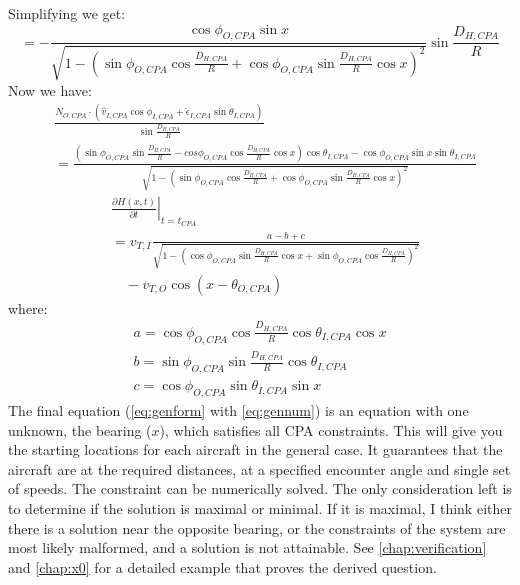 Simplifying we get:
\begin{equation}
    =-\frac{\cos{\phi_{O,CPA}}\sin{x}}{\sqrt{1-\left( \sin{\phi_{O,CPA}}\cos{\frac{D_{H,CPA}}{R}} + \cos{\phi_{O,CPA}}\sin{\frac{D_{H,CPA}}{R}}\cos{x} \right)^{2}}}\sin{\frac{D_{H,CPA}}{R}}
\end{equation}
Now we have:
\begin{equation}
    \begin{aligned}
        &\frac{N_{O,CPA} \cdot (\hat{v}_{I,CPA}\cos{\phi_{I,CPA}}+\hat{\epsilon}_{I,CPA}\sin{\theta_{I,CPA}})}{\sin{\frac{D_{H,CPA}}{R}}} \\
        &= \frac{\left( \sin{\phi_{O,CPA}}\sin{\frac{D_{H,CPA}}{R}} - cos{\phi_{O,CPA}}\cos{\frac{D_{H,CPA}}{R}}\cos{x} \right)\cos{\theta_{I,CPA}} - \cos{\phi_{O,CPA}}\sin{x}\sin{\theta_{I,CPA}}}{\sqrt{1-\left( \sin{\phi_{O,CPA}}\cos{\frac{D_{H,CPA}}{R}} + \cos{\phi_{O,CPA}}\sin{\frac{D_{H,CPA}}{R}}\cos{x} \right)^{2}}}
    \end{aligned}
\end{equation}
\begin{equation}
\label{eq:genform}
    \begin{aligned}
        &\left. \frac{\partial H(x,t)}{\partial t} \right|_{t=t_{CPA}} \\
        &= v_{T,I} \frac{a-b+c}{\sqrt{1-\left( \cos{\phi_{O,CPA}}\sin{\frac{D_{H,CPA}}{R}}\cos{x} + \sin{\phi_{O,CPA}}\cos{\frac{D_{H,CPA}}{R}} \right)^{2}}}\\
        &\quad - v_{T,O}\cos{(x-\theta_{O,CPA})}
    \end{aligned}
\end{equation}
where:
\begin{multline}
\label{eq:gennum}
    a = \cos{\phi_{O,CPA}}\cos{\frac{D_{H,CPA}}{R}}\cos{\theta_{I,CPA}}\cos{x} \\ 
    b = \sin{\phi_{O,CPA}}\sin{\frac{D_{H,CPA}}{R}}\cos{\theta_{I,CPA}} \\
    c = \cos{\phi_{O,CPA}}\sin{\theta_{I,CPA}}\sin{x}
\end{multline}
The final equation (\ref{eq:genform} with \ref{eq:gennum}) is an equation with one unknown, the bearing (\(x\)), which satisfies all CPA constraints. This will give you the starting locations for each aircraft in the general case. It guarantees that the aircraft are at the required distances, at a specified encounter angle and single set of speeds. The constraint can be numerically solved. The only consideration left is to determine if the solution is maximal or minimal. If it is maximal, I think either there is a solution near the opposite bearing, or the constraints of the system are most likely malformed, and a solution is not attainable. See \autoref{chap:verification} and \autoref{chap:x0} for a detailed example that proves the derived question.